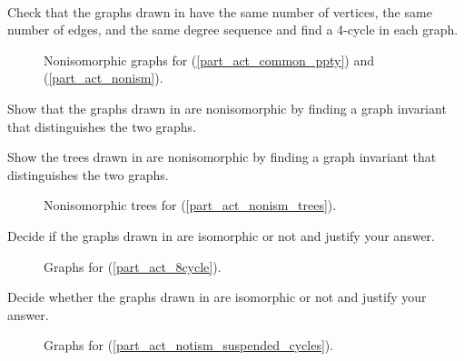 \begin{act}
\label{act_show_nonism_or_decide}
~
    \begin{actpart}
        \item \label{part_act_common_ppty} Check that the graphs drawn in  have the same number of vertices, the same number of edges, and the same degree sequence and find a 4-cycle in each graph.  
            \begin{figure}[hbtp]
                \centering
                
                \caption{Nonisomorphic graphs for  (\ref{part_act_common_ppty}) and (\ref{part_act_nonism}).}
                \label{fig_nonism_graphs_act}
            \end{figure}
        \item \label{part_act_nonism} Show that the graphs drawn in  are nonisomorphic by finding a graph invariant that distinguishes the two graphs.
        \item \label{part_act_nonism_trees} Show the trees drawn in  are nonisomorphic by finding a graph invariant that distinguishes the two graphs.
            \begin{figure}[hbtp]
                \centering
                
                \caption{Nonisomorphic trees for  (\ref{part_act_nonism_trees}).}
                \label{fig_nonism_trees_act}
            \end{figure}
        \item \label{part_act_8cycle} Decide if the graphs drawn in  are isomorphic or not and justify your answer.
            \begin{figure} [hbtp]
                \centering
                
                \caption{Graphs for  (\ref{part_act_8cycle}).}
                \label{fig_8cycles}
            \end{figure}
        \item \label{part_act_notism_suspended_cycles} Decide whether the graphs drawn in  are isomorphic or not and justify your answer.
            \begin{figure}[h!] %
                \centering
                
                \caption{Graphs for  (\ref{part_act_notism_suspended_cycles}).}
                \label{fig_suspended_cycles}
            \end{figure}
    \end{actpart}
\end{act}

